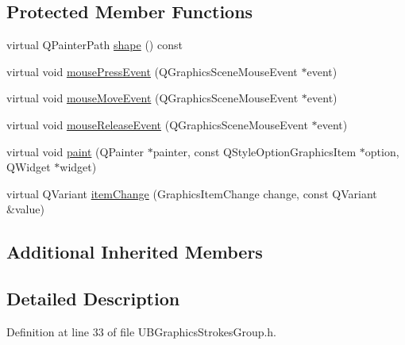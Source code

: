 \subsection*{Protected Member Functions}
\begin{DoxyCompactItemize}
\item 
virtual Q\-Painter\-Path \hyperlink{class_u_b_graphics_strokes_group_ab2b680659211b61f6bc8c81eed6e926c}{shape} () const 
\item 
virtual void \hyperlink{class_u_b_graphics_strokes_group_a778212e0bcd5eb698a017ded6ce0af71}{mouse\-Press\-Event} (Q\-Graphics\-Scene\-Mouse\-Event $\ast$event)
\item 
virtual void \hyperlink{class_u_b_graphics_strokes_group_a613e50940bd75b11179559003d862994}{mouse\-Move\-Event} (Q\-Graphics\-Scene\-Mouse\-Event $\ast$event)
\item 
virtual void \hyperlink{class_u_b_graphics_strokes_group_a4107eca52f5225011e5ce140a6156d9c}{mouse\-Release\-Event} (Q\-Graphics\-Scene\-Mouse\-Event $\ast$event)
\item 
virtual void \hyperlink{class_u_b_graphics_strokes_group_a2936951ba4b216d514edc6d6ec7934c1}{paint} (Q\-Painter $\ast$painter, const Q\-Style\-Option\-Graphics\-Item $\ast$option, Q\-Widget $\ast$widget)
\item 
virtual Q\-Variant \hyperlink{class_u_b_graphics_strokes_group_a5350676c6c3b5ea6c4cbfe0dc1f13d10}{item\-Change} (Graphics\-Item\-Change change, const Q\-Variant \&value)
\end{DoxyCompactItemize}
\subsection*{Additional Inherited Members}


\subsection{Detailed Description}


Definition at line 33 of file U\-B\-Graphics\-Strokes\-Group.\-h.



